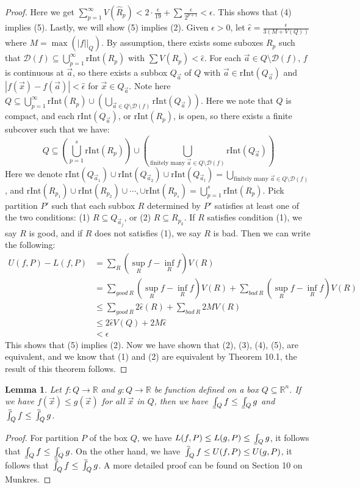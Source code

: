 \documentclass[11pt,oneside]{book}
\theoremstyle{break}
\theoremstyle{break}
\newtheorem{lem}{Lemma}[thm]
\def\upint{\mathchoice%
    {\mkern13mu\overline{\vphantom{\intop}\mkern7mu}\mkern-20mu}%
    {\mkern7mu\overline{\vphantom{\intop}\mkern7mu}\mkern-14mu}%
    {\mkern7mu\overline{\vphantom{\intop}\mkern7mu}\mkern-14mu}%
    {\mkern7mu\overline{\vphantom{\intop}\mkern7mu}\mkern-14mu}%
  \int}
\def\lowint{\mkern3mu\underline{\vphantom{\intop}\mkern7mu}\mkern-10mu\int}
\newcommand{\R}{\mathbb{R}}
\newcommand{\D}{\mathcal{D}}
\begin{document}
\begin{proof}
Here we get $\sum_{p=1}^\infty V(\hat{R}_p) < 2\cdot \frac{\epsilon}{19} + \sum \frac{\epsilon}{2^{p+1}} < \epsilon$. This shows that (4) implies (5). Lastly, we will show (5) implies (2). Given $\epsilon>0$, let $\hat{\epsilon} = \frac{\epsilon}{3(M+V(Q))}$ where $M = \max(|f||_Q)$. By assumption, there exists some suboxes $R_p$ such that $\D(f) \subseteq \bigcup_{p=1}^\infty \text{rInt}(R_p)$ with $\sum V(R_p)<\hat{\epsilon}$. For each $\vec{a}\in Q \setminus \D(f)$, $f$ is continuous at $\vec{a}$, so there exists a subbox $Q_{\vec{a}}$ of $Q$ with $\vec{a}\in \text{rInt}(Q_{\vec{a}})$ and $|f(\vec{x}) - f(\vec{a})| < \hat{\epsilon}$ for $\vec{x}\in Q_{\vec{a}}$. Note here $Q \subseteq \bigcup_{p=1}^\infty \text{rInt}(R_p) \cup (\bigcup_{\vec{a}\in Q\setminus \D(f)} \text{rInt}(Q_{\vec{a}}))$. Here we note that $Q$ is compact, and each $\text{rInt}(Q_{\vec{a}})$, or $\text{rInt}(R_p)$, is open, so there exists a finite subcover such that we have:
$$Q \subseteq \left(\bigcup_{p=1}^s \text{rInt}(R_{p})\right) \cup \left( \bigcup_{\text{finitely many }\vec{a}\in Q\setminus \D(f)} \text{rInt}(Q_{\vec{a}}) \right)$$
Here we denote $\text{rInt}(Q_{\vec{a}_1}) \cup \text{rInt}(Q_{\vec{a}_2}) \cup \text{rInt}(Q_{\vec{a}_t}) = \bigcup_{\text{finitely many }\vec{a}\in Q\setminus \D(f)}$, and $\text{rInt}(R_{p_1})\cup \text{rInt}(R_{p_2})\cup \cdots, \cup \text{rInt}(R_{p_s}) = \bigcup_{p=1}^s \text{rInt}(R_{p})$. Pick partition $P'$ such that each subbox $R$ determined by $P'$ satisfies at least one of the two conditions:
(1) $R \subseteq Q_{\vec{a}_j}$, or
(2) $R \subseteq R_{p_k}$.
If $R$ satisfies condition (1), we say $R$ is good, and if $R$ does not satisfies (1), we say $R$ is bad. Then we can write the following:
\begin{align*}
U(f,P) - L(f,P) &= \sum_{R} (\sup_{R} f - \inf_R f) V(R)\\
&= \sum_{good\ R}(\sup_{R} f - \inf_R f) V(R) + \sum_{bad\ R} (\sup_{R} f - \inf_R f) V(R)\\ &\leq \sum_{good\ R} 2\hat{ \epsilon}(R)  + \sum_{bad \ R}2MV(R)\\ &\leq 2\hat{\epsilon}V(Q) + 2M\hat{\epsilon} \\&< \epsilon
\end{align*}
This shows that (5) implies (2). Now we have shown that (2), (3), (4), (5), are equivalent, and we know that (1) and (2) are equivalent by Theorem 10.1, the result of this theorem follows.  
\end{proof}

\begin{lem}
Let $f:Q \to \R$ and $g:Q \to \R$ be function defined on a box $Q \subseteq \R^n$. If we have $f(\vec{x})\leq g(\vec{x})$ for all $\vec{x}$ in $Q$, then we have $\lowint_Q f \leq \lowint_Q g$ and $\upint_Q f \leq \upint_Q g$.
\end{lem}
\begin{proof}
For partition $P$ of the box $Q$, we have $L(f,P) \leq L(g,P) \leq \lowint_Q g$, it follows that $\lowint_Q f \leq \lowint_Q g$. On the  other hand, we have  $\upint_Q f \leq U(f,P) \leq U(g,P)$, it follows that $\upint_Q f \leq \upint_Q g$. A more detailed proof can be found on Section 10 on Munkres. 
\end{proof}
\end{document}
